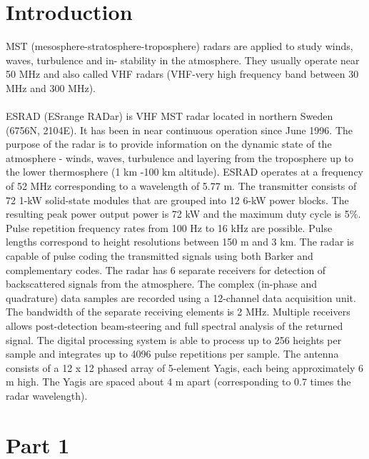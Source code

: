\documentclass{article}
\begin{document}
\section{Introduction}
MST (mesosphere-stratosphere-troposphere) radars are applied to study winds, waves, turbulence and in- stability in the atmosphere. They usually operate near 50 MHz and also called VHF radars (VHF-very high frequency band between 30 MHz and 300 MHz).\\
\\
ESRAD (ESrange RADar) is VHF MST radar located in northern Sweden (6756N, 2104E). It has been in near continuous operation since June 1996. The purpose of the radar is to provide information on the dynamic state of the atmosphere - winds, waves, turbulence and layering from the troposphere up to the lower thermosphere (1 km -100 km altitude). ESRAD operates at a frequency of 52 MHz corresponding to a wavelength of 5.77 m. The transmitter consists of 72 1-kW solid-state modules that are grouped into 12 6-kW power blocks. The resulting peak power output power is 72 kW and the maximum duty cycle is 5\%. Pulse repetition frequency rates from 100 Hz to 16 kHz are possible. Pulse lengths correspond to height resolutions between 150 m and 3 km. The radar is capable of pulse coding the transmitted signals using both Barker and complementary codes. The radar has 6 separate receivers for detection of backscattered signals from the atmosphere. The complex (in-phase and quadrature) data samples are recorded using a 12-channel data acquisition unit. The bandwidth of the separate receiving elements is 2 MHz. Multiple receivers allows post-detection beam-steering and full spectral analysis of the returned signal. The digital processing system is able to process up to 256 heights per sample and integrates up to 4096 pulse repetitions per sample. The antenna consists of a 12 x 12 phased array of 5-element Yagis, each being approximately 6 m high. The Yagis are spaced about 4 m apart (corresponding to 0.7 times the radar wavelength). \cite{Enmark:2012a2}
 

\section{Part 1}
\end{document}

